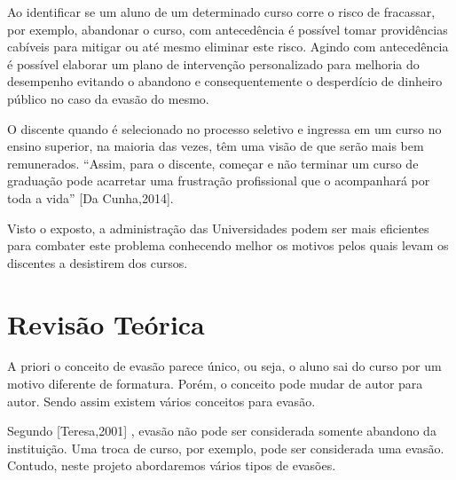 Ao identificar se um aluno de um determinado curso corre o risco de fracassar, por exemplo, abandonar o curso, com antecedência é possível tomar providências cabíveis para mitigar ou até mesmo eliminar este risco. Agindo com antecedência é possível elaborar um plano de intervenção personalizado para melhoria do desempenho evitando o abandono e consequentemente o desperdício de dinheiro público no caso da evasão do mesmo.

O discente quando é selecionado no processo seletivo e ingressa em um curso no ensino superior, na maioria das vezes, têm uma visão de que serão mais bem remunerados. “Assim, para o discente, começar e não terminar um curso de graduação pode acarretar uma frustração profissional que o acompanhará por toda a vida” [Da Cunha,2014].

Visto o exposto, a administração das Universidades podem ser mais eficientes para combater este problema conhecendo melhor os motivos pelos quais levam os discentes a desistirem dos cursos.  
 \begin{comment} 
\section{Metodologia}%

Para realização do estudo serão usadas como fonte as bases de dados dos sistemas de controle acadêmicos da Universidade de Brasília, com enfoque no ciclo de vida acadêmico dos discentes e docentes. Aplicar técnicas de mineração de dados para a descoberta de novos padrões relacionados as diversas formas de evasões dos cursos ofertados pela UnB para que possam prever tendências que  auxiliarão a equipe de planejamento a acompanhar e definir as metas e diretrizes da Universidade no âmbito acadêmico.
\end{comment}

\section{Revisão Teórica}%

A priori o conceito de evasão parece único, ou seja, o aluno sai do curso por um motivo diferente de formatura.  Porém, o conceito pode mudar de autor para autor. Sendo assim existem vários conceitos para evasão. 

Segundo [Teresa,2001] %
, evasão não pode ser considerada somente abandono da instituição. Uma troca de curso, por exemplo, pode ser considerada uma evasão. Contudo, neste projeto abordaremos vários tipos de evasões.
 
